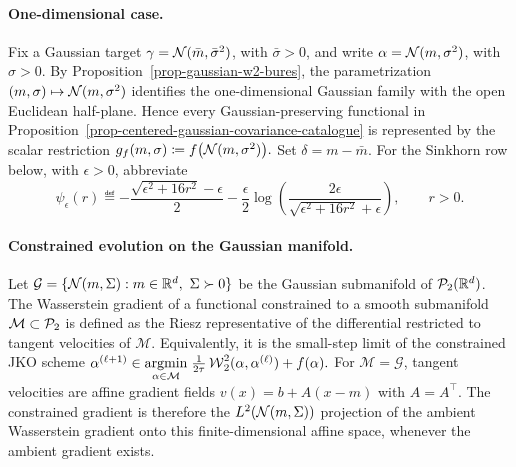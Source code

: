 \paragraph{One-dimensional case.}
Fix a Gaussian target $\gamma=\mathcal{N}(\bar m,\bar\sigma^2)$, with $\bar\sigma>0$, and write $\alpha=\mathcal{N}(m,\sigma^2)$, with $\sigma>0$. By Proposition~\ref{prop-gaussian-w2-bures}, the parametrization $(m,\sigma)\mapsto\mathcal{N}(m,\sigma^2)$ identifies the one-dimensional Gaussian family with the open Euclidean half-plane. Hence every Gaussian-preserving functional in Proposition~\ref{prop-centered-gaussian-covariance-catalogue} is represented by the scalar restriction
\(g_f(m,\sigma)\coloneqq f\bigl(\mathcal{N}(m,\sigma^2)\bigr).\)
Set $\delta=m-\bar m$. For the Sinkhorn row below, with $\epsilon>0$, abbreviate
\[
\psi_\epsilon(r)
\eqdef
-\frac{\sqrt{\epsilon^2+16r^2}-\epsilon}{2}
-\frac{\epsilon}{2}
\log\!\left(
\frac{2\epsilon}{\sqrt{\epsilon^2+16r^2}+\epsilon}
\right),
\qquad r>0.
\]
\paragraph{Constrained evolution on the Gaussian manifold.}
Let
\(\mathcal G=\{\mathcal{N}(m,\Sigma):m\in\mathbb{R}^d,\ \Sigma\succ0\}\)
be the Gaussian submanifold of $\mathcal{P}_2(\mathbb{R}^d)$. The Wasserstein gradient of a functional constrained to a smooth submanifold $\mathcal M\subset\mathcal{P}_2$ is defined as the Riesz representative of the differential restricted to tangent velocities of $\mathcal M$. Equivalently, it is the small-step limit of the constrained JKO scheme
\(\alpha^{(\ell+1)}\in \underset{\alpha\in\mathcal M}{\operatorname{argmin}}\; \frac{1}{2\tau}\operatorname{\mathcal{W}}_2^2(\alpha,\alpha^{(\ell)})+f(\alpha).\)
For $\mathcal M=\mathcal G$, tangent velocities are affine gradient fields $v(x)=b+A(x-m)$ with $A=A^\top$. The constrained gradient is therefore the $L^2(\mathcal{N}(m,\Sigma))$ projection of the ambient Wasserstein gradient onto this finite-dimensional affine space, whenever the ambient gradient exists.


